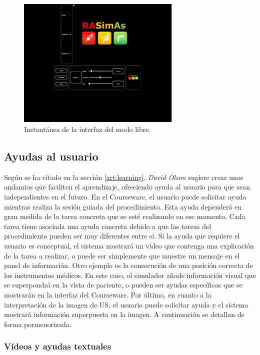 \begin{figure}[htbp]
    \centering
    \includegraphics[width=0.7\textwidth]{IMG/freeui.PNG}
    \caption{Instantánea de la interfaz del modo libre.}
    \label{fig:freeui}
\end{figure}


 

\subsection{Ayudas al usuario}
\label{course:ayudas}

Según se ha citado en la sección \ref{art:learning}, \emph{David Olson} \cite{olson2014jerome} sugiere crear unos andamios que faciliten el aprendizaje, ofreciendo ayuda al usuario para que sean independientes en el futuro. En el \ac{Courseware}, el usuario puede solicitar ayuda mientras realiza la sesión guiada del procedimiento. Esta ayuda dependerá en gran medida de la tarea concreta que se esté realizando en ese momento. Cada tarea tiene asociada una ayuda concreta debido a que las tareas del procedimiento pueden ser muy diferentes entre sí. Si la ayuda que requiere el usuario es conceptual, el sistema mostrará un vídeo que contenga una explicación de la tarea a realizar, o puede ser simplemente que muestre un mensaje en el panel de información. Otro ejemplo es la consecución de una posición correcta de los instrumentos médicos. En este caso, el simulador añade información visual que se superpondrá en la vista de paciente, o pueden ser ayudas específicas que se mostrarán en la interfaz del \ac{Courseware}. Por último, en cuanto a la interpretación de la imagen de \ac{US}, el usuario puede solicitar ayuda y el sistema mostrará información superpuesta en la imagen. A continuación se detallan de forma pormenorizada.


\subsubsection{Vídeos y ayudas textuales}


